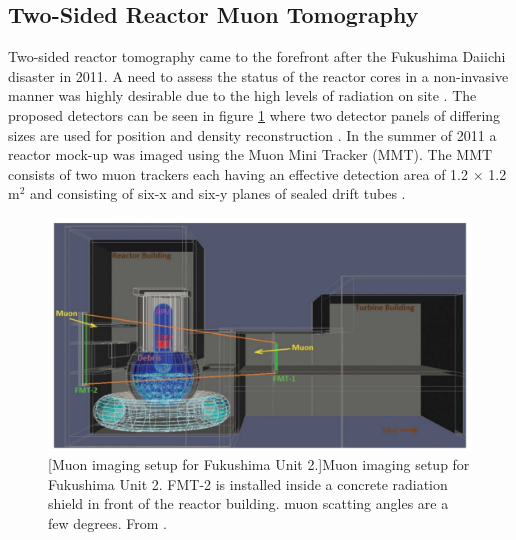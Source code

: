 \subsection{Two-Sided Reactor Muon Tomography}
Two-sided reactor tomography came to the forefront after the Fukushima Daiichi disaster in 2011. A need to assess the status of the reactor cores in a non-invasive manner was highly desirable due to the high levels of radiation on site \cite{miyadera2013imaging}. The proposed detectors can be seen in figure \ref{fig:fukushimaImaging} where two detector panels of differing sizes are used for position and density reconstruction \cite{miyadera2013imaging}. In the summer of 2011 a reactor mock-up was imaged using the Muon Mini Tracker (MMT). The MMT consists of two muon trackers each having an effective detection area of 1.2 $\times$ 1.2 m$^2$ and consisting of six-x and six-y planes of sealed drift tubes \cite{miyadera2013imaging}.

\begin{figure}[!h]
 \centering
 \includegraphics[width=0.7\linewidth]{Chapter5/Figs/MuTomographyExamples/fukushimaImaging.jpg}
 [Muon imaging setup for Fukushima Unit 2.]{Muon imaging setup for Fukushima Unit 2. FMT-2 is installed inside a concrete radiation shield in front of the reactor building. muon scatting angles are a few degrees. From \cite{miyadera2013imaging}.} 
 \label{fig:fukushimaImaging}
\end{figure}

